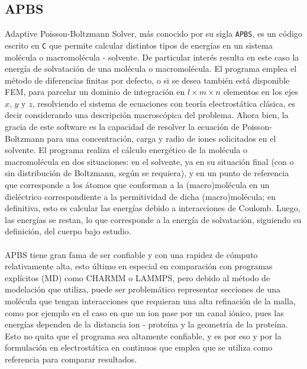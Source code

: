\documentclass[12pt, twoside, onehalfspace, numbers, spanish]{ezthesis}
\numberwithin{equation}{section}
\begin{document}
\subsection{APBS}\label{subsec:APBS}
Adaptive Poisson-Boltzmann Solver, más conocido por su sigla \texttt{APBS}, es un código escrito en \texttt{C} que permite calcular distintos tipos de energías en un sistema molécula o macromolécula - solvente. De particular interés resulta en este caso la energía de solvatación de una molécula o macromolécula. El programa emplea el método de diferencias finitas por defecto, o si se desea también está disponible FEM, para parcelar un dominio de integración en $l\times m\times n$ elementos en los ejes $x$, $y$ y $z$, resolviendo el sistema de ecuaciones con teoría electrostática clásica, es decir considerando una descripción macroscópica del problema. Ahora bien, la gracia de este software es la capacidad de resolver la ecuación de Poisson-Boltzmann para una concentración, carga y radio de iones solicitados en el solvente. El programa realiza el cálculo energético de la molécula o macromolécula en dos situaciones: en el solvente, ya en su situación final (con o sin distribución de Boltzmann, según se requiera), y en un punto de referencia que corresponde a los átomos que conforman a la (macro)molécula en un dieléctrico correspondiente a la permitividad de dicha (macro)molécula; en definitiva, esto es calcular las energías debido a interacciones de Coulomb. Luego, las energías se restan, lo que corresponde a la energía de solvatación, siguiendo su definición, del cuerpo bajo estudio.\\\\
APBS tiene gran fama de ser confiable y con una rapidez de cómputo relativamente alta, esto último en especial en comparación con programas explícitos (MD) como CHARMM o LAMMPS, pero debido al método de modelación que utiliza, puede ser problemático representar secciones de una molécula que tengan interacciones que requieran una alta refinación de la malla, como por ejemplo en el caso en que un ion pase por un canal iónico, pues las energías dependen de la distancia ion - proteína y la geometría de la proteína. Esto no quita que el programa sea altamente confiable, y es por eso y por la formulación en electrostática en continuos que emplea que se utiliza como referencia para comparar resultados.\\\\
\end{document}
